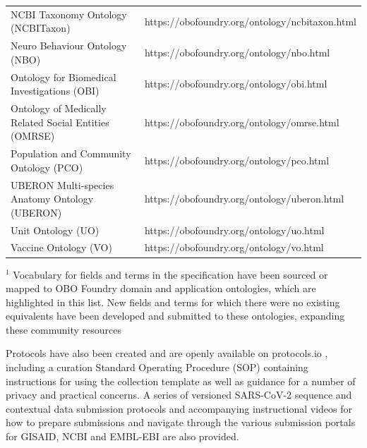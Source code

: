 \begin{table}[h!]
{\begin{tabular}{@{}ll@{}}
NCBI Taxonomy Ontology (NCBITaxon)           & https://obofoundry.org/ontology/ncbitaxon.html \\
Neuro Behaviour Ontology (NBO)               & https://obofoundry.org/ontology/nbo.html       \\
Ontology for Biomedical Investigations (OBI) & https://obofoundry.org/ontology/obi.html       \\
Ontology of Medically Related Social Entities (OMRSE)                & https://obofoundry.org/ontology/omrse.html  \\
Population and Community Ontology (PCO)      & https://obofoundry.org/ontology/pco.html       \\
UBERON Multi-species Anatomy Ontology (UBERON)                       & https://obofoundry.org/ontology/uberon.html \\
Unit Ontology (UO)                           & https://obofoundry.org/ontology/uo.html        \\
Vaccine Ontology (VO)                        & https://obofoundry.org/ontology/vo.html        \\ \bottomrule
\end{tabular}%
}
\item $^1$ Vocabulary for fields and terms in the specification have been sourced or mapped to OBO Foundry domain and application ontologies, which are highlighted in this list. New fields and terms for which there were no existing equivalents have been developed and submitted to these ontologies, expanding these community resources
\end{table}

Protocols have also been created and are openly available on protocols.io \cite{public_health_alliance_for_genomic_epidemiology_pha4ge_nodate}, including a curation Standard Operating Procedure (SOP) containing instructions for using the collection template as well as guidance for a number of privacy and practical concerns. A series of versioned SARS-CoV-2 sequence and contextual data submission protocols and accompanying instructional videos for how to prepare submissions and navigate through the various submission portals for GISAID, NCBI and EMBL-EBI are also provided.

